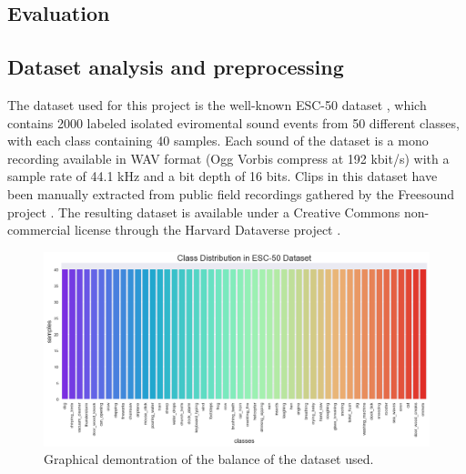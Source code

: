 \documentclass{article}
\begin{document}
\begin{sloppy}
\section{Evaluation}
\label{sec:evaluation}

\subsection{Dataset analysis and preprocessing}
\label{sec:dataset_analysis}

The dataset used for this project is the well-known ESC-50 dataset \cite{piczak2015dataset}, which contains
2000 labeled isolated eviromental sound events from 50 different classes, with each class containing 40 samples.
Each sound of the dataset is a mono recording available in WAV format (Ogg Vorbis
compress at 192 kbit/s) with a sample rate of 44.1 kHz and a bit depth of 16 bits.
Clips in this dataset have been manually extracted from public field recordings gathered
by the Freesound project \cite{fonseca2020fsd50k}. The resulting dataset is available under a Creative
Commons non-commercial license through the Harvard Dataverse project \cite{piczak2015dataset}.

\begin{figure}[ht]
  \centering
  \centerline{\includegraphics[width=\columnwidth]{balanced_dataset.png}}
  \caption{Graphical demontration of the balance of the dataset used.}
  \label{fig:balanced_dataset}
\end{figure}


\end{sloppy}
\end{document}
